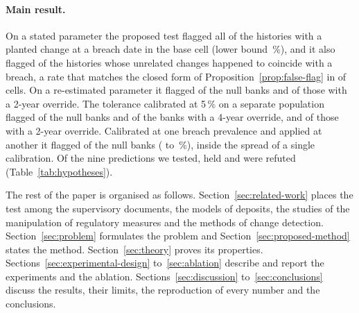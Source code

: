 \paragraph{Main result.}
On a stated parameter the proposed test flagged all of the \statedN{} histories with a planted change at a breach date in the base cell (lower bound \statedAltLoEngine{}\,\%), and it also flagged \statedNullEngine{} of the histories whose unrelated changes happened to coincide with a breach, a rate that matches the closed form of Proposition~\ref{prop:false-flag} in \bernInside{} of \bernCells{} cells. On a re-estimated parameter it flagged \fitNullEngine{} of the null banks and \fitAddCEngine{} of those with a 2-year override. The tolerance calibrated at 5\,\% on a separate population flagged \fitNullTol{} of the null banks and \fitAddDTol{} of the banks with a 4-year override, and \fitAddCTol{} of those with a 2-year override. Calibrated at one breach prevalence and applied at another it flagged \fitMisCTol{} of the null banks (\fitMisCTolLo{} to \fitMisCTolHi{}\,\%), inside the spread of a single calibration. Of the nine predictions we tested, \hypothesesHeld{} held and \hypothesesRefuted{} were refuted (Table~\ref{tab:hypotheses}).

The rest of the paper is organised as follows. Section~\ref{sec:related-work} places the test among the supervisory documents, the models of deposits, the studies of the manipulation of regulatory measures and the methods of change detection. Section~\ref{sec:problem} formulates the problem and Section~\ref{sec:proposed-method} states the method. Section~\ref{sec:theory} proves its properties. Sections~\ref{sec:experimental-design} to~\ref{sec:ablation} describe and report the experiments and the ablation. Sections~\ref{sec:discussion} to~\ref{sec:conclusions} discuss the results, their limits, the reproduction of every number and the conclusions.
